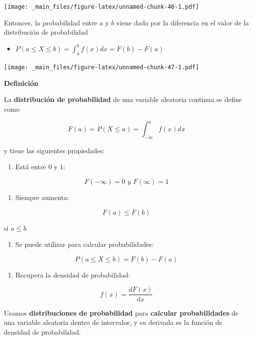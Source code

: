 \documentclass[
]{book}
\providecommand{\tightlist}{%
  \setlength{\itemsep}{0pt}\setlength{\parskip}{0pt}}
\begin{document}
\texttt{[image: \_main\_files/figure-latex/unnamed-chunk-46-1.pdf]}

Entonces, la probabilidad entre \(a\) y \(b\) viene dada por la diferencia en el valor de la distribución de probabilidad

\begin{itemize}
\tightlist
\item
  \(P( a\leq X \leq b) = \int_a^b f(x)dx=F(b)-F(a)\)
\end{itemize}

\texttt{[image: \_main\_files/figure-latex/unnamed-chunk-47-1.pdf]}

\textbf{Definición}

La \textbf{distribución de probabilidad} de una variable aleatoria continua se define como

\[F(a)= P( X\leq a) =\int_{-\infty } ^af(x)dx\]

y tiene las siguientes propiedades:

\begin{enumerate}
\def\labelenumi{\arabic{enumi})}
\tightlist
\item
  Está entre \(0\) y \(1\):
\end{enumerate}

\[F(-\infty )= 0\,\, y \,\,F(\infty )=1\]

\begin{enumerate}
\def\labelenumi{\arabic{enumi})}
\setcounter{enumi}{1}
\tightlist
\item
  Siempre aumenta:
\end{enumerate}

\[F(a)\leq F(b)\]

si \(a \leq b\)

\begin{enumerate}
\def\labelenumi{\arabic{enumi})}
\setcounter{enumi}{2}
\tightlist
\item
  Se puede utilizar para calcular probabilidades:
\end{enumerate}

\[P( a \leq X \leq b)=F(b)-F(a)\]

\begin{enumerate}
\def\labelenumi{\arabic{enumi})}
\setcounter{enumi}{3}
\tightlist
\item
  Recupera la densidad de probabilidad:
\end{enumerate}

\[f(x)=\frac{ dF (x )}{ dx}\]

Usamos \textbf{distribuciones de probabilidad} para \textbf{calcular probabilidades} de una variable aleatoria dentro de intervalos, y su derivada es la función de densidad de probabilidad.
\end{document}
